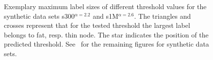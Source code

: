 \begin{figure}[!ht]
\centering
\hspace*{-1em}
\hspace*{-1.9em}
%
\caption{Exemplary maximum label sizes of different threshold values for the synthetic data sets s300$^{\alpha=2.2}$ and s1M$^{\alpha=2.6}$. 
The triangles and crosses represent that for the tested threshold the largest label belongs to fat, resp. thin node. The star indicates the position of the predicted threshold.
See~\cite{petersen2015near} for the remaining  figures for synthetic data sets.}%
\label{f:bla3}%
\end{figure}